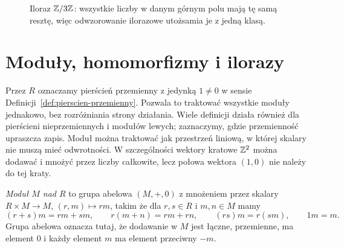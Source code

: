 \begin{figure}[htbp]
\centering
{}
\caption{Iloraz $\mathbb{Z}/3\mathbb{Z}$: wszystkie liczby w danym
górnym polu mają tę samą resztę, więc odwzorowanie ilorazowe
utożsamia je z jedną klasą.}
\label{fig:reszty-modulo-3-5}
\end{figure}

\section{Moduły, homomorfizmy i ilorazy}
\label{sec:moduly}

Przez $R$ oznaczamy pierścień przemienny z jedynką
$1\ne0$ w sensie Definicji~\ref{def:pierscien-przemienny}.
Pozwala to traktować wszystkie moduły
jednakowo, bez rozróżniania strony działania.
Wiele definicji działa również dla pierścieni
nieprzemiennych i modułów lewych; zaznaczymy,
gdzie przemienność upraszcza zapis.
Moduł można traktować jak przestrzeń liniową, w której
skalary nie muszą mieć odwrotności. W szczególności
wektory kratowe $\mathbb{Z}^2$ można dodawać i mnożyć przez
liczby całkowite, lecz połowa wektora $(1,0)$
nie należy do tej kraty.

\begin{definicja}
\label{def:modul}
\emph{Moduł $M$ nad $R$} to grupa abelowa
$(M,+,0)$ z mnożeniem przez skalary
$R\times M\to M$, $(r,m)\mapsto rm$, takim że
dla $r,s\in R$ i $m,n\in M$ mamy
\[
 (r+s)m=rm+sm,\qquad r(m+n)=rm+rn,\qquad
 (rs)m=r(sm),\qquad 1m=m.
\]
Grupa abelowa oznacza tutaj, że dodawanie w $M$
jest łączne, przemienne, ma element $0$ i każdy
element $m$ ma element przeciwny $-m$.
\end{definicja}

